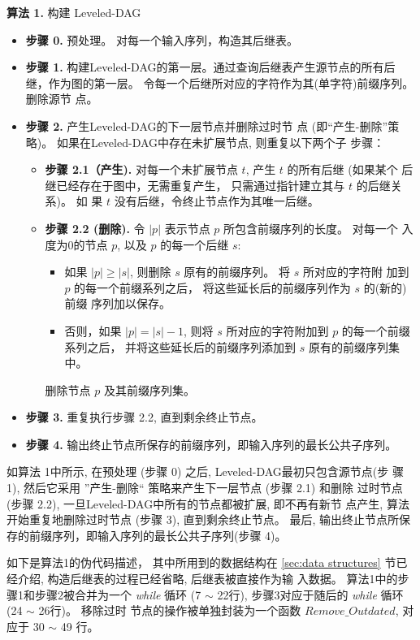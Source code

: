 \textbf{算法 1.} 构建 Leveled-DAG
\begin{itemize}
\item \textbf{步骤 0.} 预处理。 对每一个输入序列，构造其后继表。
\item \textbf{步骤 1.} 构建Leveled-DAG的第一层。通过查询后继表产生源节点的所有后
  继，作为图的第一层。 令每一个后继所对应的字符作为其(单字符)前缀序列。删除源节
  点。
\item \textbf{步骤 2.} 产生Leveled-DAG的下一层节点并删除过时节
  点 (即“产生-删除”策略)。 如果在Leveled-DAG中存在未扩展节点, 则重复以下两个子
  步骤：
  \begin{itemize}
  \item \textbf{步骤 2.1（产生).} 对每一个未扩展节点 $t$, 产生 $t$ 的所有后继 (如果某个
    后继已经存在于图中，无需重复产生， 只需通过指针建立其与 $t$ 的后继关系)。 如
    果 $t$ 没有后继，令终止节点作为其唯一后继。
  \item \textbf{步骤 2.2 (删除).} 令 $|p|$ 表示节点 $p$ 所包含前缀序列的长度。 对每一个
    入度为0的节点 $p$, 以及 $p$ 的每一个后继 $s$:
    \begin{itemize}
    \item 如果 $|p| \geq |s|$, 则删除 $s$ 原有的前缀序列。 将 $s$ 所对应的字符附
      加到 $p$ 的每一个前缀系列之后， 将这些延长后的前缀序列作为 $s$ 的(新的)前缀
      序列加以保存。
    \item 否则，如果 $|p| = |s|-1$, 则将 $s$ 所对应的字符附加到 $p$ 的每一个前缀
      系列之后， 并将这些延长后的前缀序列添加到 $s$ 原有的前缀序列集中。
    \end{itemize}
    删除节点 $p$ 及其前缀序列集。
  \end{itemize}
\item \textbf{步骤 3.} 重复执行步骤 2.2, 直到剩余终止节点。
\item \textbf{步骤 4.} 输出终止节点所保存的前缀序列，即输入序列的最长公共子序列。
\end{itemize}

如算法 1中所示, 在预处理 (步骤 0) 之后, Leveled-DAG最初只包含源节点(步
骤 1), 然后它采用 ”产生-删除“ 策略来产生下一层节点 (步骤 2.1) 和删除
过时节点 (步骤 2.2), 一旦Leveled-DAG中所有的节点都被扩展, 即不再有新节
点产生, 算法开始重复地删除过时节点 (步骤 3), 直到剩余终止节点。 最后,
输出终止节点所保存的前缀序列，即输入序列的最长公共子序列(步骤 4)。

如下是算法1的伪代码描述， 其中所用到的数据结构在 \ref{sec:data
  structures} 节已经介绍, 构造后继表的过程已经省略, 后继表被直接作为输
入数据。 算法1中的步骤1和步骤2被合并为一个 \emph{while} 循环 (7 $\sim$
22行), 步骤3对应于随后的 \emph{while} 循环 (24 $\sim$ 26行)。 移除过时
节点的操作被单独封装为一个函数 $Remove\_Outdated$, 对应于 30 $\sim$ 49
行。

